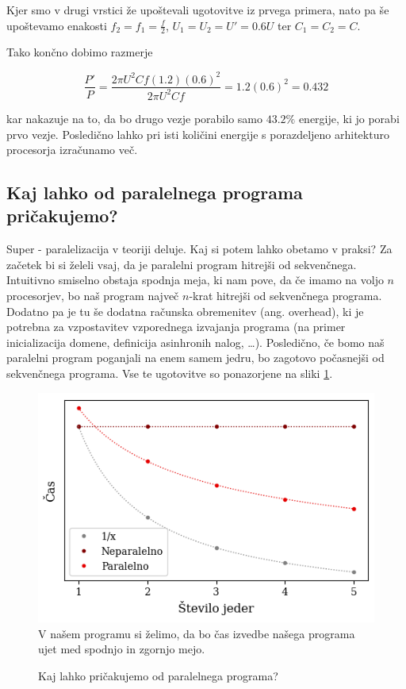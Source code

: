 \documentclass[mat1, tisk]{fmfdelo}
\begin{document}
Kjer smo v drugi vrstici že upoštevali ugotovitve iz prvega primera, nato pa še upoštevamo enakosti
$f_2 = f_1 = \frac{f}{2}$, $U_1 = U_2 = U' = 0.6U$ ter $C_1 = C_2 = C$.

Tako končno dobimo razmerje 

\begin{equation}
  \frac{P'}{P} = \frac{2\pi U^2Cf(1.2)(0.6)^2}{2\pi U^2Cf} = 1.2(0.6)^2 = 0.432
\end{equation}

kar nakazuje na to, da bo drugo vezje porabilo samo $43.2\%$ energije, ki jo porabi prvo vezje.
Posledično lahko pri isti količini energije s porazdeljeno arhitekturo procesorja izračunamo več.

\subsection{Kaj lahko od paralelnega programa pričakujemo?}

Super - paralelizacija v teoriji deluje. Kaj si potem lahko obetamo v praksi? Za začetek bi si želeli vsaj, da
je paralelni program hitrejši od sekvenčnega. 
Intuitivno smiselno obstaja spodnja meja, ki nam pove, da če imamo na voljo $n$ procesorjev, bo naš program največ 
$n$-krat hitrejši od sekvenčnega programa.
Dodatno pa je tu še dodatna računska obremenitev (ang. overhead), ki je potrebna za vzpostavitev vzporednega izvajanja
programa (na primer inicializacija domene, definicija asinhronih nalog, \dots). 
Posledično, če bomo naš paralelni program poganjali na enem samem jedru, bo 
zagotovo počasnejši od sekvenčnega programa. Vse te ugotovitve so ponazorjene na sliki
\ref{fig:cilj-casovne-zahtevnosti-paralelizacije}.

\begin{figure}[h!]
  \centering
  \caption{Kaj lahko pričakujemo od paralelnega programa?}
  \includegraphics[width=13cm]{slike/cilj-casovne-zahtevnosti-paralelizacije.png}
  \label{fig:cilj-casovne-zahtevnosti-paralelizacije}
  \smallskip
  \footnotesize{V našem programu si želimo, da bo čas izvedbe našega programa ujet med spodnjo in zgornjo mejo.}
\end{figure}
\end{document}
